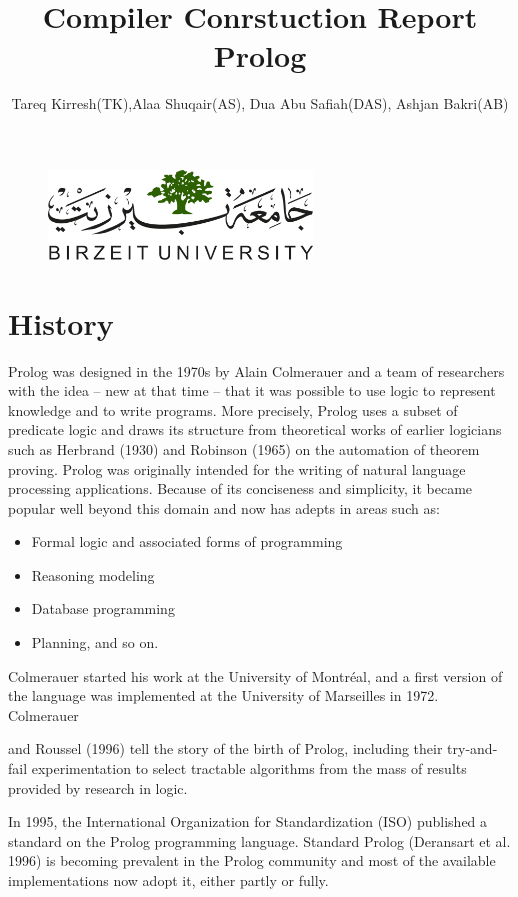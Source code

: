 \documentclass[14pt]{article}
\title{Compiler Conrstuction Report\\Prolog}
\author{Tareq Kirresh(TK),Alaa Shuqair(AS), Dua Abu Safiah(DAS), Ashjan Bakri(AB)}
\begin{document}
\begin{figure}
\centering
  \includegraphics[width=7cm]{LOGO.png}
\end{figure}
\maketitle
\newpage
\tableofcontents 
\newpage 
\section{History}

Prolog was designed in the 1970s by Alain Colmerauer and a team of researchers with the idea – new at that time – that it was possible to use logic to represent knowledge and to write programs. More precisely, Prolog uses a subset of predicate logic and draws its structure from theoretical works of earlier logicians such as Herbrand (1930) and Robinson (1965) on the automation of theorem proving. Prolog was originally intended for the writing of natural language processing applications. Because of its conciseness and simplicity, it became popular well beyond this domain and now has adepts in areas such as:

\begin{itemize}
\item Formal logic and associated forms of programming
\item Reasoning modeling
\item Database programming
\item Planning, and so on.
\end{itemize}
Colmerauer started his work at the University of Montréal, and a first version of the language was implemented at the University of Marseilles in 1972. Colmerauer
	
and Roussel (1996) tell the story of the birth of Prolog, including their try-and-fail
experimentation to select tractable algorithms from the mass of results provided by
research in logic.

In 1995, the International Organization for Standardization (ISO) published a
standard on the Prolog programming language. Standard Prolog (Deransart et al.
1996) is becoming prevalent in the Prolog community and most of the available implementations now adopt it, either partly or fully.
 
\end{document}
